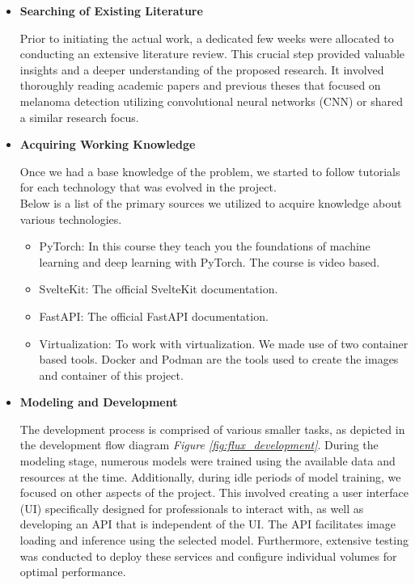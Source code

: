 \begin{itemize}
\item{\textbf{Searching of Existing Literature}}

Prior to initiating the actual work, a dedicated few weeks were allocated to conducting an extensive literature review.
This crucial step provided valuable insights and a deeper understanding of the proposed research.
It involved thoroughly reading academic papers and previous theses that focused on melanoma detection utilizing convolutional neural networks (CNN) or shared a similar research focus.

\item{\textbf{Acquiring Working Knowledge}}

Once we had a base knowledge of the problem,
we started to follow tutorials for each technology that was evolved in the project. \\

Below is a list of the primary sources we utilized to acquire knowledge about various technologies.

\begin{itemize}
    \item PyTorch: \cite{LearnPyTorch} In this course they teach you the foundations of machine learning and deep learning with PyTorch. The course is video based.

    \item SvelteKit: \cite{LearnSvelteKit} The official SvelteKit documentation.

    \item FastAPI: \cite{LearnFastAPI} The official FastAPI documentation.

    \item Virtualization: To work with virtualization. We made use of two container based tools. Docker \cite{LearnDocker} and Podman \cite{LearnPodman} are the tools used to create the images and container of this project.
\end{itemize}

\item{\textbf{Modeling and Development}}

The development process is comprised of various smaller tasks, as depicted in the development
flow diagram \textit{Figure \ref{fig:flux_development}}.
During the modeling stage, numerous models were trained using the available data and resources at the time.
Additionally, during idle periods of model training,
we focused on other aspects of the project.
This involved creating a user interface (UI) specifically designed for professionals to interact with,
as well as developing an API that is independent of the UI.
The API facilitates image loading and inference using the selected model.
Furthermore, extensive testing was conducted to deploy these services and configure individual volumes for optimal performance.


\end{itemize}
